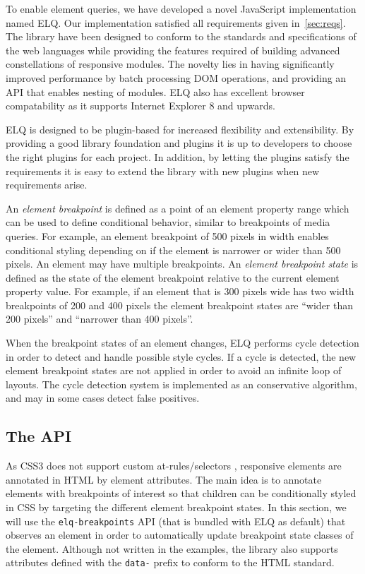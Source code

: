 \documentclass{acm_proc_article-sp}
\newcommand{\code}[1]{\texttt{#1}}
\newcommand{\elq}{ELQ}
\begin{document}
  To enable element queries, we have developed a novel JavaScript implementation named \elq{}.
  Our implementation satisfied all requirements given in~\ref{sec:reqs}.
  The library have been designed to conform to the standards and specifications of the web languages while providing the features required of building advanced constellations of responsive modules.
  The novelty lies in having significantly improved performance by batch processing DOM operations, and providing an API that enables nesting of modules.
  \elq{} also has excellent browser compatability as it supports Internet Explorer 8 and upwards.

  \elq{} is designed to be plugin-based for increased flexibility and extensibility.
  By providing a good library foundation and plugins it is up to developers to choose the right plugins for each project.
  In addition, by letting the plugins satisfy the requirements it is easy to extend the library with new plugins when new requirements arise.

  An \emph{element breakpoint} is defined as a point of an element property range which can be used to define conditional behavior, similar to breakpoints of media queries.
  For example, an element breakpoint of 500 pixels in width enables conditional styling depending on if the element is narrower or wider than 500 pixels.
  An element may have multiple breakpoints.
  An \emph{element breakpoint state} is defined as the state of the element breakpoint relative to the current element property value.
  For example, if an element that is 300 pixels wide has two width breakpoints of 200 and 400 pixels the element breakpoint states are ``wider than 200 pixels'' and ``narrower than 400 pixels''.

  When the breakpoint states of an element changes, \elq{} performs cycle detection in order to detect and handle possible style cycles.
  If a cycle is detected, the new element breakpoint states are not applied in order to avoid an infinite loop of layouts.
  The cycle detection system is implemented as an conservative algorithm, and may in some cases detect false positives.

  \subsection{The API}\label{sec:elq-api}
    As CSS3 does not support custom at-rules/selectors \cite{w3c_css_selectors}, responsive elements are annotated in HTML by element attributes.
    The main idea is to annotate elements with breakpoints of interest so that children can be conditionally styled in CSS by targeting the different element breakpoint states.
    In this section, we will use the \code{elq-breakpoints} API (that is bundled with \elq{} as default) that observes an element in order to automatically update breakpoint state classes of the element.
    Although not written in the examples, the library also supports attributes defined with the \code{data-} prefix to conform to the HTML standard.
\end{document}
